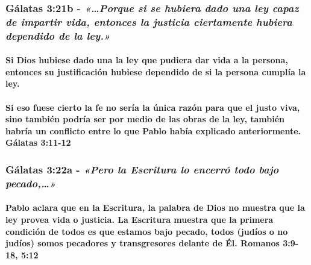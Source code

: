 \documentclass[11a pt,twoside]{article}
\newcommand{\scripture}[1]{%
  {\fontsize{12pt}{16pt}\selectfont\ScriptureFont\itshape #1}%
}
\let\oldsubsubsection\subsubsection
\renewcommand{\subsubsection}{\needspace{4\baselineskip}\oldsubsubsection}
\let\oldparagraph\paragraph
\renewcommand{\paragraph}{\needspace{3\baselineskip}\oldparagraph}
\begin{document}
\subsubsection{\texorpdfstring{Gálatas 3:21b -
\scripture{«…Porque si se hubiera dado una ley capaz de impartir vida, entonces la justicia ciertamente hubiera dependido de la ley.»}}{Gálatas 3:21b - }}\label{guxe1latas-321b---porque-si-se-hubiera-dado-una-ley-capaz-de-impartir-vida-entonces-la-justicia-ciertamente-hubiera-dependido-de-la-ley.}

\paragraph{Si Dios hubiese dado una la ley que pudiera dar vida a la
persona, entonces su justificación hubiese dependido de si la persona
cumplía la
ley.}\label{si-dios-hubiese-dado-una-la-ley-que-pudiera-dar-vida-a-la-persona-entonces-su-justificaciuxf3n-hubiese-dependido-de-si-la-persona-cumpluxeda-la-ley.}

\paragraph{Si eso fuese cierto la fe no sería la única razón para que el
justo viva, sino también podría ser por medio de las obras de la ley,
también habría un conflicto entre lo que Pablo había explicado
anteriormente. Gálatas
3:11-12}\label{si-eso-fuese-cierto-la-fe-no-seruxeda-la-uxfanica-razuxf3n-para-que-el-justo-viva-sino-tambiuxe9n-podruxeda-ser-por-medio-de-las-obras-de-la-ley-tambiuxe9n-habruxeda-un-conflicto-entre-lo-que-pablo-habuxeda-explicado-anteriormente.-guxe1latas-311-12}

\subsubsection{\texorpdfstring{Gálatas 3:22a -
\scripture{«Pero la Escritura lo encerró todo bajo pecado,…»}}{Gálatas 3:22a - }}\label{guxe1latas-322a---pero-la-escritura-lo-encerruxf3-todo-bajo-pecado}

\paragraph{Pablo aclara que en la Escritura, la palabra de Dios no
muestra que la ley provea vida o justicia. La Escritura muestra que la
primera condición de todos es que estamos bajo pecado, todos (judíos o
no judíos) somos pecadores y transgresores delante de Él. Romanos
3:9-18,
5:12}\label{pablo-aclara-que-en-la-escritura-la-palabra-de-dios-no-muestra-que-la-ley-provea-vida-o-justicia.-la-escritura-muestra-que-la-primera-condiciuxf3n-de-todos-es-que-estamos-bajo-pecado-todos-juduxedos-o-no-juduxedos-somos-pecadores-y-transgresores-delante-de-uxe9l.-romanos-39-18-512}
\end{document}
